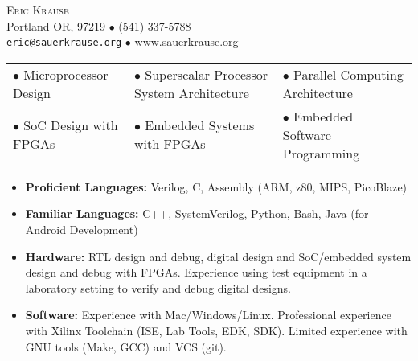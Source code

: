 \documentclass{article}
\begin{document}
\fancyhf{}

\vspace*{-.5in} %

\begin{center}
	{\LARGE \scshape {Eric Krause}}	\\
	Portland OR, 97219  $\bullet$ (541) 337-5788\\
	\texttt{\href{mailto:eric@sauerkrause.org}{eric@sauerkrause.org}}
  $\bullet$  \url{www.sauerkrause.org}\\
\end{center}



	\hspace{-4pt}


	
	
	\vspace{-5pt}


	\begin{table}[h!]
	\small\vspace{-8pt}
	\begin{tabular}{lll}
	$\bullet$ Microprocessor Design & $\bullet$ Superscalar Processor System Architecture & $\bullet$ Parallel Computing Architecture\\
	$\bullet$ SoC Design with FPGAs & $\bullet$ Embedded Systems with FPGAs & $\bullet$ Embedded Software Programming\\
	\end{tabular}
	\vspace{-17pt}
\end{table}	


 \vspace{-6pt}
	\begin{itemize}\setlength{\itemsep}{-4pt}

		\item\textbf{Proficient Languages:} Verilog, C, Assembly (ARM, z80, MIPS, PicoBlaze)
		\item\textbf{Familiar Languages:} C++, SystemVerilog, Python, Bash, Java (for Android Development)
		\item\textbf{Hardware:} RTL design and debug, digital design and SoC/embedded system design and debug with FPGAs.  Experience using test equipment in a laboratory setting to verify and debug digital designs.
		\item\textbf{Software:} Experience with Mac/Windows/Linux.  Professional experience with Xilinx Toolchain (ISE, Lab Tools, EDK, SDK).  Limited experience with GNU tools (Make, GCC) and VCS (git).
	\end{itemize}
	\vspace{-8pt}
\end{document}
